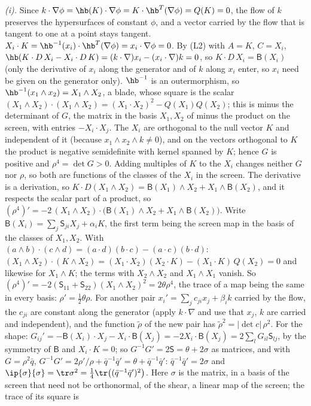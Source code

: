 \emph{(i).} Since $k \cdot \nabla\phi = \hb(K) \cdot \nabla\phi = K \cdot \hb^{T}(\nabla\phi) = Q(K) = 0$, the flow of $k$ preserves the hypersurfaces of constant $\phi$, and a vector carried by the flow that is tangent to one at a point stays tangent. $X_{i} \cdot K = \hb^{-1}(x_{i}) \cdot \hb^{T}(\nabla\phi) = x_{i} \cdot \nabla\phi = 0$. By (L2) with $A = K$, $C = X_{i}$, $\hb(K \cdot D\,X_{i} - X_{i} \cdot D\,K) = (k \cdot \nabla)x_{i} - (x_{i} \cdot \nabla)k = 0$, so $K \cdot D\,X_{i} = \mathsf{B}(X_{i})$ (only the derivative of $x_{i}$ along the generator and of $k$ along $x_{i}$ enter, so $x_{i}$ need be given on the generator only). $\hb^{-1}$ is an outermorphism, so $\hb^{-1}(x_{1} \wedge x_{2}) = X_{1} \wedge X_{2}$, a blade, whose square is the scalar $(X_{1} \wedge X_{2}) \cdot (X_{1} \wedge X_{2}) = (X_{1} \cdot X_{2})^{2} - Q(X_{1})Q(X_{2})$; this is minus the determinant of $G$, the matrix in the basis $X_{1}, X_{2}$ of minus the product on the screen, with entries $-X_{i} \cdot X_{j}$. The $X_{i}$ are orthogonal to the null vector $K$ and independent of it (because $x_{1} \wedge x_{2} \wedge k \neq 0$), and on the vectors orthogonal to $K$ the product is negative semidefinite with kernel spanned by $K$; hence $G$ is positive and $\rho^{4} = \det G > 0$. Adding multiples of $K$ to the $X_{i}$ changes neither $G$ nor $\rho$, so both are functions of the classes of the $X_{i}$ in the screen. The derivative is a derivation, so $K \cdot D(X_{1} \wedge X_{2}) = \mathsf{B}(X_{1}) \wedge X_{2} + X_{1} \wedge \mathsf{B}(X_{2})$, and it respects the scalar part of a product, so $(\rho^{4})' = -2\,(X_{1} \wedge X_{2}) \cdot \bigl(\mathsf{B}(X_{1}) \wedge X_{2} + X_{1} \wedge \mathsf{B}(X_{2})\bigr)$. Write $\mathsf{B}(X_{i}) = \sum_{j}\mathsf{S}_{ji}X_{j} + \alpha_{i}K$, the first term being the screen map in the basis of the classes of $X_{1}, X_{2}$. With $(a \wedge b) \cdot (c \wedge d) = (a \cdot d)(b \cdot c) - (a \cdot c)(b \cdot d)$: $(X_{1} \wedge X_{2}) \cdot (K \wedge X_{2}) = (X_{1} \cdot X_{2})(X_{2} \cdot K) - (X_{1} \cdot K)\,Q(X_{2}) = 0$ and likewise for $X_{1} \wedge K$; the terms with $X_{2} \wedge X_{2}$ and $X_{1} \wedge X_{1}$ vanish. So $(\rho^{4})' = -2(\mathsf{S}_{11} + \mathsf{S}_{22})(X_{1} \wedge X_{2})^{2} = 2\theta\rho^{4}$, the trace of a map being the same in every basis: $\rho' = \tfrac12\theta\rho$. For another pair $x_{i}' = \sum_{j}c_{ji}x_{j} + \beta_{i}k$ carried by the flow, the $c_{ji}$ are constant along the generator (apply $k \cdot \nabla$ and use that $x_{j}$, $k$ are carried and independent), and the function $\tilde\rho$ of the new pair has $\tilde\rho^{2} = |\det c|\,\rho^{2}$. For the shape: $G_{ij}' = -\mathsf{B}(X_{i}) \cdot X_{j} - X_{i} \cdot \mathsf{B}(X_{j}) = -2X_{i} \cdot \mathsf{B}(X_{j}) = 2\sum_{l}G_{il}\mathsf{S}_{lj}$, by the symmetry of $\mathsf{B}$ and $X_{i} \cdot K = 0$; so $G^{-1}G' = 2\mathsf{S} = \theta + 2\sigma$ as matrices, and with $G = \rho^{2}\bar q$, $G^{-1}G' = 2\rho'/\rho + \bar q^{-1}\bar q' = \theta + \bar q^{-1}\bar q'$: $\bar q^{-1}\bar q' = 2\sigma$ and $\ip{\sigma}{\sigma} = \tr\sigma^{2} = \tfrac14\tr\bigl((\bar q^{-1}\bar q')^{2}\bigr)$. Here $\sigma$ is the matrix, in a basis of the screen that need not be orthonormal, of the shear, a linear map of the screen; the trace of its square is 